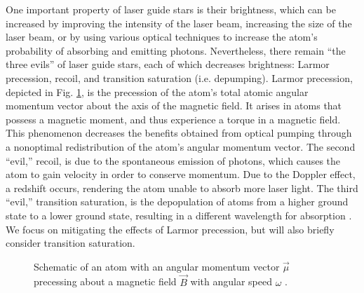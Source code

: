 One important property of laser guide stars is their brightness, which can be increased by improving the intensity of the laser beam, increasing the size of the laser beam, or by using various optical techniques to increase the atom's probability of absorbing and emitting photons. Nevertheless, there remain ``the three evils'' of laser guide stars, each of which decreases brightness: Larmor precession, recoil, and transition saturation (i.e. depumping). Larmor precession, depicted in Fig. \ref{fig:larpre}, is the precession of the atom's total atomic angular momentum vector about the axis of the magnetic field. It arises in atoms that possess a magnetic moment, and thus experience a torque in a magnetic field. This phenomenon decreases the benefits obtained from optical pumping through a nonoptimal redistribution of the atom's angular momentum vector. The second ``evil,'' recoil, is due to the spontaneous emission of photons, which causes the atom to gain velocity in order to conserve momentum. Due to the Doppler effect, a redshift occurs, rendering the atom unable to absorb more laser light. The third ``evil,'' transition saturation, is the depopulation of atoms from a higher ground state to a lower ground state, resulting in a different wavelength for absorption \cite{Holzlohner2012}. We focus on mitigating the effects of Larmor precession, but will also briefly consider transition saturation.

\begin{figure}[h]
		\centering
		\caption{Schematic of an atom with an angular momentum vector $\vec \mu$ precessing about a magnetic field $\vec B$ with angular speed $\omega$ \protect\cite{larmor}.}
		\label{fig:larpre}
\end{figure}


